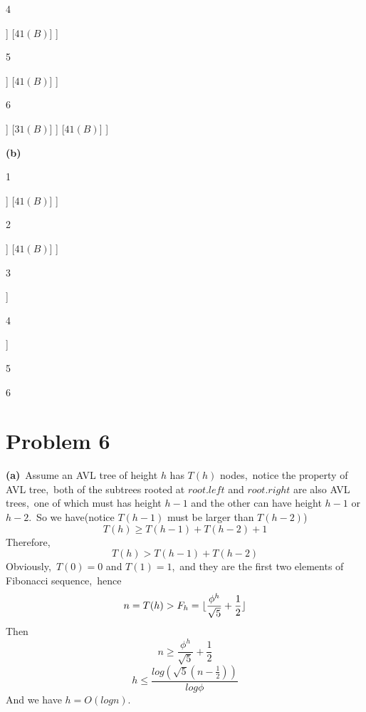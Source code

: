\documentclass[]{article}
\begin{document}
	\textcircled{4}
	\begin{forest}
		[$38(B)$
			[$31(B)$
				[$12(R)$]
				[]
			]
			[$41(B)$]
		]
	\end{forest}
	\textcircled{5}
	\begin{forest}
		[$38(B)$
			[$19(B)$
				[$12(R)$]
				[$31(R)$]
			]
			[$41(B)$]
		]
	\end{forest}

	\textcircled{6}
	\begin{forest}
		[$38(B)$
			[$19(R)$
				[$12(B)$
					[$8(R)$]
					[]
				]
				[$31(B)$]
			]
			[$41(B)$]
		]
	\end{forest}

	\textbf{(b)}
	
	\textcircled{1}
	\begin{forest}
		[$38(B)$
			[$19(R)$
				[$12(B)$]
				[$31(B)$]
			]
			[$41(B)$]
		]
	\end{forest}

	\textcircled{2}
	\begin{forest}
		[$38(B)$
			[$19(B)$
				[]
				[$31(R)$]
			]
			[$41(B)$]
		]
	\end{forest}

	\textcircled{3}
	\begin{forest}
		[$38(B)$
			[$31(B)$]
			[$41(B)$]
		]
	\end{forest}

	\textcircled{4}
	\begin{forest}
		[$38(B)$
			[]
			[$41(R)$]
		]
	\end{forest}
	\textcircled{5}
	\begin{forest}
		[$41(B)$]
	\end{forest}
	\textcircled{6}
	
	\section{Problem 6}
	\textbf{(a)}\ Assume an AVL tree of height $h$ has $T(h)$ nodes,\ notice the property of AVL tree,\ both of the subtrees rooted at $root.left$ and $root.right$ are also AVL trees,\ one of which must has height $h-1$ and the other can have height $h-1$ or $h-2$.\ So we have(notice $T(h-1)$ must be larger than $T(h-2)$)
	\begin{equation*}
	T(h) \geq T(h-1) + T(h-2) + 1
	\end{equation*}
	Therefore,
	\begin{equation*}
	T(h) > T(h-1) + T(h-2)
	\end{equation*}
	Obviously,\ $T(0) = 0$ and $T(1) = 1$,\ and they are the first two elements of Fibonacci sequence,\ hence
	\begin{equation*}
	n = T(h) > F_h = \lfloor\frac{\phi^h}{\sqrt{5}} + \frac{1}{2}\rfloor\\
	\end{equation*}
	Then 
	\begin{equation*}
	n \geq \frac{\phi^h}{\sqrt{5}} + \frac{1}{2}
	\end{equation*}
	\begin{equation*}
	h \leq \frac{log(\sqrt{5}(n-\frac{1}{2}))}{log\phi}
	\end{equation*}
	And we have $h = O(logn)$.
	
\end{document}
